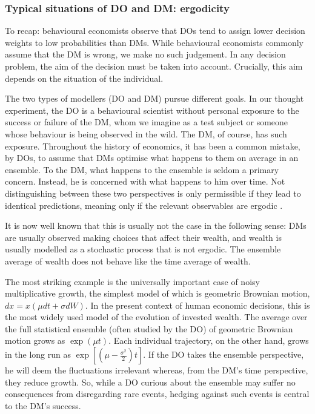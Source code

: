 \documentclass[a4paper, 12pt]{article}
\begin{document}
\subsubsection{Typical situations of DO and DM: ergodicity}
To recap: behavioural economists observe that DOs tend to assign lower decision weights to low probabilities than DMs. While behavioural economists commonly assume that the DM is wrong, we make no such judgement. In any decision problem, the aim of the decision must be taken into account. Crucially, this aim depends on the situation of the individual.

The two types of modellers (DO and DM) pursue different goals. In our thought experiment, the DO is a behavioural scientist without personal exposure to the success or failure of the DM, whom we imagine as a test subject or someone whose behaviour is being observed in the wild. The DM, of course, has such exposure. Throughout the history of economics, it has been a common mistake, by DOs, to assume that DMs optimise what happens to them on average in an ensemble. To the DM, what happens to the ensemble is seldom a primary concern. Instead, he is concerned with what happens to him over time. Not distinguishing between these two perspectives is only permissible if they lead to identical predictions, meaning only if the relevant observables are ergodic \parencite{Peters2019b}.

It is now well known that this is usually not the case in the following sense: DMs are usually observed making choices that affect their wealth, and wealth is usually modelled as a stochastic process that is not ergodic. The ensemble average of wealth does not behave like the time average of wealth.

The most striking example is the universally important case of noisy multiplicative growth, the simplest model of which is geometric Brownian motion, $dx=x(\mu dt+\sigma dW)$. In the present context of human economic decisions, this is the most widely used model of the evolution of invested wealth. The average over the full statistical ensemble (often studied by the DO) of geometric Brownian motion grows as $\exp(\mu t)$. Each individual trajectory, on the other hand, grows in the long run as $\exp[(\mu-\frac{\sigma^2}{2})t]$. If the DO takes the ensemble perspective, he will deem the fluctuations irrelevant whereas, from the DM's time perspective, they reduce growth. So, while a DO curious about the ensemble may suffer no consequences from disregarding rare events, hedging against such events is central to the DM's success.
\end{document}
